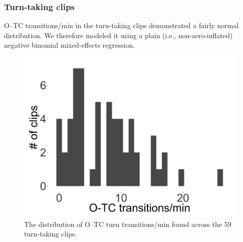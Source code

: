 \documentclass[floatsintext,man]{apa6}
\theoremstyle{definition}
\theoremstyle{definition}
\theoremstyle{definition}
\theoremstyle{remark}
\begin{document}
\FloatBarrier

\subsubsection{Turn-taking clips}\label{models-o_tc-turntaking}

O--TC transitions/min in the turn-taking clips demonstrated a fairly
normal distribution. We therefore modeled it using a plain (i.e.,
non-zero-inflated) negative binomial mixed-effects regression.

\FloatBarrier

\begin{figure}[H]

{\centering \includegraphics[width=0.4\linewidth]{www/o_c_tpm_turntaking_distribution} 

}

\caption{The distribution of O--TC turn transitions/min found across the 59 turn-taking clips.}\label{fig:fig22}
\end{figure}

\FloatBarrier
\end{document}
